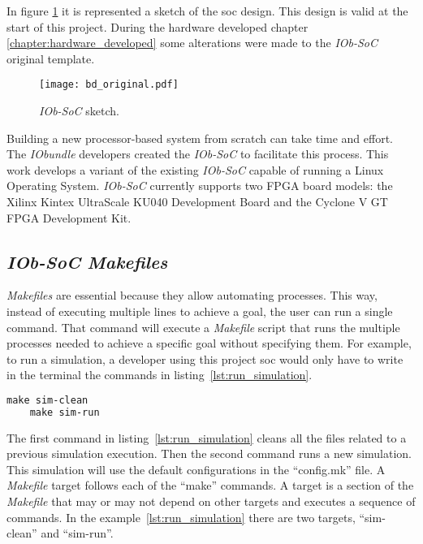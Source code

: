 In figure \ref{fig:bd_original} it is represented a sketch of the \acrshort{soc} design. This design is valid at the start of this project. During the hardware developed chapter \ref{chapter:hardware_developed} some alterations were made to the \textit{IOb-SoC} original template.

\begin{figure}[!ht]
    \centering
    \texttt{[image: bd\_original.pdf]}
    \caption{\textit{IOb-SoC} sketch.}
    \label{fig:bd_original}
\end{figure}

Building a new processor-based system from scratch can take time and effort. The \textit{IObundle} developers created the \textit{IOb-SoC} to facilitate this process. This work develops a variant of the existing \textit{IOb-SoC} capable of running a Linux Operating System. \textit{IOb-SoC} currently supports two FPGA board models: the Xilinx Kintex UltraScale KU040 Development Board and the Cyclone V GT FPGA Development Kit.

\subsection{\textit{IOb-SoC} \textit{Makefiles}}
\label{subsection:iob_makefiles}
\textit{Makefiles} are essential because they allow automating processes. This way, instead of executing multiple lines to achieve a goal, the user can run a single command. That command will execute a \textit{Makefile} script that runs the multiple processes needed to achieve a specific goal without specifying them. For example, to run a simulation, a developer using this project \acrshort{soc} would only have to write in the terminal the commands in listing~\ref{lst:run_simulation}.

\begin{lstlisting}[language=make, caption={Run a simulation.}, label=lst:run_simulation]
    make sim-clean
    make sim-run
\end{lstlisting}

The first command in listing~\ref{lst:run_simulation} cleans all the files related to a previous simulation execution. Then the second command runs a new simulation. This simulation will use the default configurations in the \enquote{config.mk} file. A \textit{Makefile} target follows each of the \enquote{make} commands. A target is a section of the \textit{Makefile} that may or may not depend on other targets and executes a sequence of commands. In the example~\ref{lst:run_simulation} there are two targets, \enquote{sim-clean} and \enquote{sim-run}.

